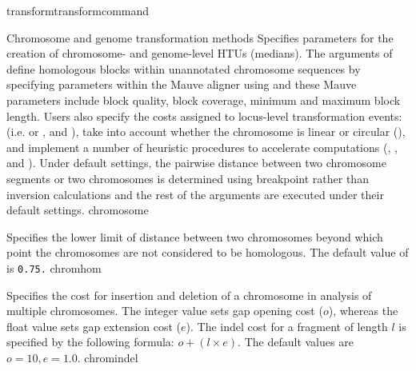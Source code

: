 \begin{command}{transform}{transformcommand}
\begin{arguments}
\begin{argumentgroup}{Chromosome and genome transformation methods}
{Specifies parameters for the creation of chro\-mosome- and genome-level 
HTUs (medians). The arguments of  define 
homologous blocks within unannotated chromosome sequences by
specifying parameters within the Mauve aligner \cite{darlingetal2004} using
 and these Mauve parameters include 
block quality, block coverage, minimum and maximum block
length. Users also specify the costs assigned to locus-level transformation 
events: (i.e.  %
or , and ), 
take into account whether the chromosome is linear or circular 
(), and implement a number of heuristic 
procedures to accelerate computations (, 
, and ). 
Under default settings, the pairwise distance between two chromosome 
segments or two chromosomes is determined using breakpoint rather 
than inversion calculations and the rest of the arguments are executed 
under their default settings.}
{chromosome}


{Specifies the lower limit of distance between two chromosomes beyond which 
point the chromosomes are not considered to be homologous. 
The default value of  is \texttt{0.75.}}
{chromhom}

{Specifies the cost for insertion and deletion of a chromosome in analysis of
multiple chromosomes. The integer value sets gap opening
cost ($o$), whereas the float value sets gap extension
cost ($e$). The indel cost for a fragment of length $l$ is
specified by the following formula:
$o + (l \times e)$. The default values are $o=10, e=1.0$.}
{chromindel}


\end{argumentgroup}
\end{arguments}
\end{command}
